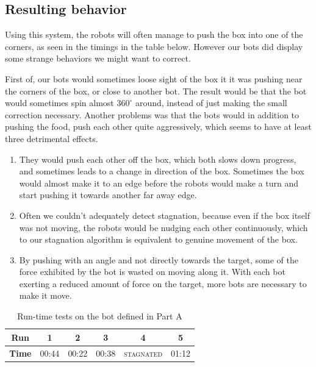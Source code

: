 \documentclass[a4paper,10pt]{article}
\begin{document}
\subsection{Resulting behavior}
\label{sec:part-a behavior}

Using this system, the robots will often manage to push the box into one of
the corners, as seen in the timings in the table below. However our bots did
display some strange behaviors we might want to correct.

First of, our bots would sometimes loose sight of the box it it was
pushing near the corners of the box, or close to another bot. The result would
be that the bot would sometimes spin almost $360^\circ$ around, instead of
just making the small correction necessary. Another problems was that the
bots would in addition to pushing the food, push each other quite aggressively,
which seems to have at least three detrimental effects.
\begin{enumerate}
\item They would push
each other off the box, which both slows down progress, and sometimes
leads to a change in direction of the box. Sometimes the box would almost
make it to an edge before the robots would make a turn and start pushing
it towards another far away edge.
\item Often we couldn't adequately detect stagnation, because even if
the box itself was not moving, the robots would be nudging each other
continuously, which to our stagnation algorithm is equivalent to genuine
movement of the box.
\item By pushing with an angle and not directly towards the target, some of 
    the force exhibited by the bot is wasted on moving along it. With each bot 
    exerting a reduced amount of force on the target, more bots are necessary 
    to make it move.
\end{enumerate}

\begin{table}
    \centering
    \begin{tabular}{c|c|c|c|c|c}
        \textbf{Run}    & \textbf{1} & \textbf{2} & \textbf{3} &
        \textbf{4}      & \textbf{5}     \\ \hline
        \textbf{Time}   & 00:44 & 00:22 & 00:38 &
        \textsc{stagnated} & 01:12 \\
    \end{tabular}
    \caption{Run-time tests on the bot defined in Part A}
\end{table}
\end{document}
